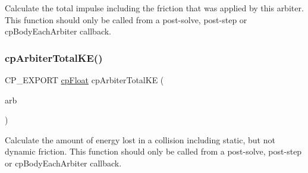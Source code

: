 Calculate the total impulse including the friction that was applied by this arbiter. This function should only be called from a post-\/solve, post-\/step or cp\+Body\+Each\+Arbiter callback. \mbox{\label{group__cp_arbiter_ga9918019bc0e4af5a2618e0ddeec4d64c}} 
\subsubsection{\texorpdfstring{cp\+Arbiter\+Total\+K\+E()}{cpArbiterTotalKE()}}
{\footnotesize\ttfamily C\+P\+\_\+\+E\+X\+P\+O\+RT \mbox{\hyperlink{group__basic_types_gac1ed65573e035bf892505768c852d8d3}{cp\+Float}} cp\+Arbiter\+Total\+KE (\begin{DoxyParamCaption}\item[{const \mbox{\hyperlink{structcp_arbiter}{cp\+Arbiter}} $\ast$}]{arb }\end{DoxyParamCaption})}

Calculate the amount of energy lost in a collision including static, but not dynamic friction. This function should only be called from a post-\/solve, post-\/step or cp\+Body\+Each\+Arbiter callback. 